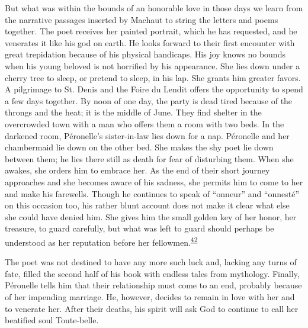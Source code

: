 But what was within the bounds of an honorable love in those days we
learn from the narrative passages inserted by Machaut to string the
letters and poems together. The poet receives her painted portrait,
which he has requested, and he venerates it like his god on earth. He
looks forward to their first encounter with great trepidation because of
his physical handicaps. His joy knows no bounds when his young beloved
is not horrified by his appearance. She lies down under a cherry tree to
sleep, or pretend to sleep, in his lap. She grants him greater favors. A
pilgrimage to St. Denis and the Foire du Lendit offers the opportunity
to spend a few days together. By noon of one day, the party is dead
tired because of the throngs and the heat; it is the middle of June.
They find shelter in the overcrowded town with a man who offers them a
room with two beds. In the darkened room, Péronelle's sister-in-law lies
down for a nap. Péronelle and her chambermaid lie down on the
\protect\hypertarget{11_Chapter_Four__THE_FORMS_OF_LOVE.xhtmlux5cux23page_146}{}{}other
bed. She makes the shy poet lie down between them; he lies there still
as death for fear of disturbing them. When she awakes, she orders him to
embrace her. As the end of their short journey approaches and she
becomes aware of his sadness, she permits him to come to her and make
his farewells. Though he continues to speak of ``onneur'' and
``onnesté'' on this occasion too, his rather blunt account does not make
it clear what else she could have denied him. She gives him the small
golden key of her honor, her treasure, to guard carefully, but what was
left to guard should perhaps be understood as her reputation before her
fellowmen.\textsuperscript{\protect\hypertarget{11_Chapter_Four__THE_FORMS_OF_LOVE.xhtmlux5cux23id_1405}{\protect\hyperlink{23_NOTES.xhtmlux5cux23id_1406}{42}}}

The poet was not destined to have any more such luck and, lacking any
turns of fate, filled the second half of his book with endless tales
from mythology. Finally, Péronelle tells him that their relationship
must come to an end, probably because of her impending marriage. He,
however, decides to remain in love with her and to venerate her. After
their deaths, his spirit will ask God to continue to call her beatified
soul Toute-belle.


